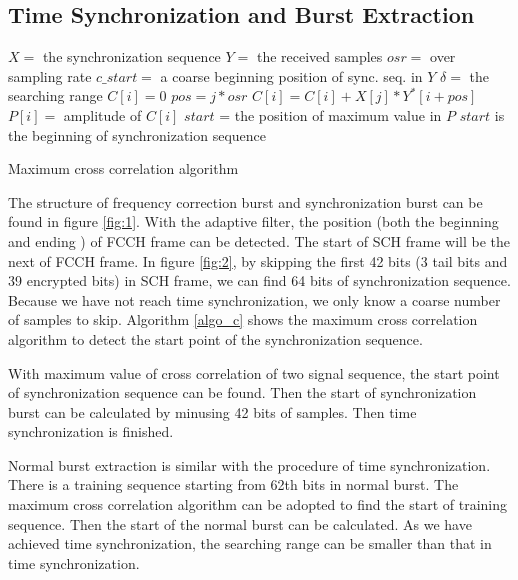 \documentclass[a4paper,12pt,oneside]{article}
\begin{document}
\subsection{Time Synchronization and Burst Extraction}

\begin{algorithm}[!t]
\begin{algorithmic}[1]
    \STATE $X = $ the synchronization sequence
    \STATE $Y = $ the received samples
    \STATE $osr = $ over sampling rate
    \STATE $c\_start = $ a coarse beginning position of sync. seq. in $Y$
    \STATE $\delta = $ the searching range
        \STATE $C[i] = 0$
            \STATE $pos = j*osr$
            \STATE $C[i] = C[i] + X[j]*Y^*[i+pos]$
        \ENDFOR
        \STATE $P[i] = $ amplitude of $C[i]$
    \ENDFOR
    \STATE $start$ = the position of maximum value in $P$
    \STATE $start$ is the beginning of synchronization sequence
\end{algorithmic}
\caption{Maximum cross correlation algorithm}
\label{algo_c}
\end{algorithm}
The structure of frequency correction burst and synchronization burst can be found in figure \ref{fig:1}. With the adaptive filter,
the position (both the beginning and ending ) of FCCH frame can be detected. The start of SCH frame will be the next of FCCH frame.
In figure \ref{fig:2}, by skipping the first 42 bits (3 tail bits and 39 encrypted bits) in SCH frame, we can find 64 bits of synchronization sequence. Because we have not reach time synchronization, we only
know a coarse number of samples to skip. Algorithm \ref{algo_c} shows the maximum cross correlation algorithm to detect the start point of the synchronization sequence.


With maximum value of cross correlation of two signal sequence, the start point of synchronization sequence can be found. Then the start of synchronization burst can be calculated by minusing 42 bits of samples. 
Then time synchronization is finished.

Normal burst extraction is similar with the procedure of time synchronization. There is a training sequence starting from 62th bits in normal burst. The maximum cross correlation algorithm can be adopted to find the start of training sequence.
Then the start of the normal burst can be calculated. 
As we have achieved time synchronization, the searching range can be smaller than that in time synchronization. 
\end{document}
